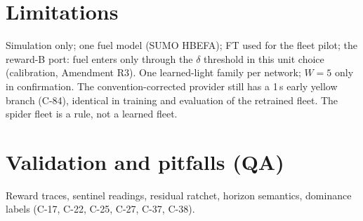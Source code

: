 \documentclass[11pt]{article}
\begin{document}
\section{Limitations}
Simulation only; one fuel model (SUMO HBEFA); FT used for the fleet pilot; the reward-B port: fuel enters only through the $\delta$
threshold in this unit choice (calibration, Amendment R3).
One learned-light family per network; $W=5$ only in confirmation. The convention-corrected provider still has a 1\,s early yellow branch
(C-84), identical in training and evaluation of the retrained fleet. The spider fleet is a rule, not a learned fleet.

\appendix
\section{Validation and pitfalls (QA)}
Reward traces, sentinel readings, residual ratchet, horizon semantics, dominance labels (C-17, C-22, C-25, C-27, C-37, C-38).
\end{document}
